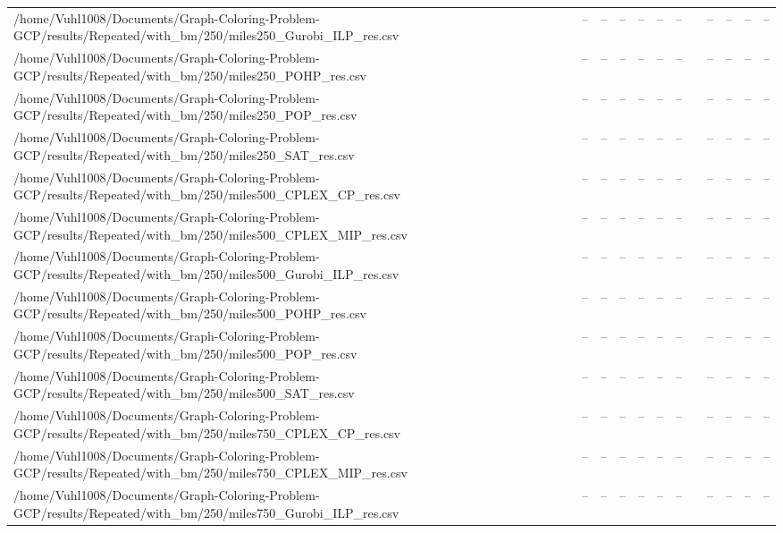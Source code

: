 \begin{table}[htbp]
\begin{tabular}{llllllllllll}
/home/Vuhl1008/Documents/Graph-Coloring-Problem-GCP/results/Repeated/with\_bm/250/miles250\_Gurobi\_ILP\_res.csv & -- & -- & -- & -- & -- & -- & {} & -- & -- & -- & -- \\
/home/Vuhl1008/Documents/Graph-Coloring-Problem-GCP/results/Repeated/with\_bm/250/miles250\_POHP\_res.csv & -- & -- & -- & -- & -- & -- & {} & -- & -- & -- & -- \\
/home/Vuhl1008/Documents/Graph-Coloring-Problem-GCP/results/Repeated/with\_bm/250/miles250\_POP\_res.csv & -- & -- & -- & -- & -- & -- & {} & -- & -- & -- & -- \\
/home/Vuhl1008/Documents/Graph-Coloring-Problem-GCP/results/Repeated/with\_bm/250/miles250\_SAT\_res.csv & -- & -- & -- & -- & -- & -- & {} & -- & -- & -- & -- \\
/home/Vuhl1008/Documents/Graph-Coloring-Problem-GCP/results/Repeated/with\_bm/250/miles500\_CPLEX\_CP\_res.csv & -- & -- & -- & -- & -- & -- & {} & -- & -- & -- & -- \\
/home/Vuhl1008/Documents/Graph-Coloring-Problem-GCP/results/Repeated/with\_bm/250/miles500\_CPLEX\_MIP\_res.csv & -- & -- & -- & -- & -- & -- & {} & -- & -- & -- & -- \\
/home/Vuhl1008/Documents/Graph-Coloring-Problem-GCP/results/Repeated/with\_bm/250/miles500\_Gurobi\_ILP\_res.csv & -- & -- & -- & -- & -- & -- & {} & -- & -- & -- & -- \\
/home/Vuhl1008/Documents/Graph-Coloring-Problem-GCP/results/Repeated/with\_bm/250/miles500\_POHP\_res.csv & -- & -- & -- & -- & -- & -- & {} & -- & -- & -- & -- \\
/home/Vuhl1008/Documents/Graph-Coloring-Problem-GCP/results/Repeated/with\_bm/250/miles500\_POP\_res.csv & -- & -- & -- & -- & -- & -- & {} & -- & -- & -- & -- \\
/home/Vuhl1008/Documents/Graph-Coloring-Problem-GCP/results/Repeated/with\_bm/250/miles500\_SAT\_res.csv & -- & -- & -- & -- & -- & -- & {} & -- & -- & -- & -- \\
/home/Vuhl1008/Documents/Graph-Coloring-Problem-GCP/results/Repeated/with\_bm/250/miles750\_CPLEX\_CP\_res.csv & -- & -- & -- & -- & -- & -- & {} & -- & -- & -- & -- \\
/home/Vuhl1008/Documents/Graph-Coloring-Problem-GCP/results/Repeated/with\_bm/250/miles750\_CPLEX\_MIP\_res.csv & -- & -- & -- & -- & -- & -- & {} & -- & -- & -- & -- \\
/home/Vuhl1008/Documents/Graph-Coloring-Problem-GCP/results/Repeated/with\_bm/250/miles750\_Gurobi\_ILP\_res.csv & -- & -- & -- & -- & -- & -- & {} & -- & -- & -- & -- \\

\end{tabular}
\end{table}
